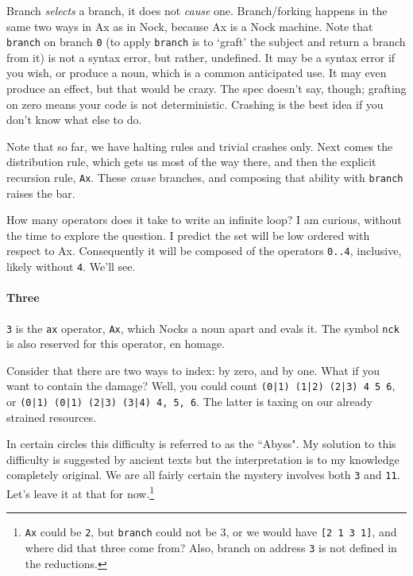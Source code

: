 \documentclass[twoside]{article}
\begin{document}
Branch \emph{selects} a branch, it does not \emph{cause} one. Branch/forking happens in the same two ways in Ax as in Nock, because Ax is a Nock machine. Note that \texttt{branch} on branch \texttt{0} (to apply \texttt{branch} is to `graft' the subject and return a branch from it) is not a syntax error, but rather, undefined. It may be a syntax error if you wish, or produce a noun, which is a common anticipated use. It may even produce an effect, but that would be crazy. The spec doesn't say, though; grafting on zero means your code is not deterministic. Crashing is the best idea if you don't know what else to do. 

Note that so far, we have halting rules and trivial crashes only. Next comes the distribution rule, which gets us most of the way there, and then the explicit recursion rule, \texttt{Ax}. These \emph{cause} branches, and composing that ability with \texttt{branch} raises the bar. 

How many operators does it take to write an infinite loop? I am curious, without the time to explore the question. I predict the set will be low ordered with respect to Ax. Consequently it will be composed of the operators \texttt{0..4}, inclusive, likely without \texttt{4}. We'll see. 

\paragraph{Three}

\texttt{3} is the \texttt{ax} operator, \texttt{Ax}, which Nocks a noun apart and evals it. The symbol \texttt{nck} is also reserved for this operator, en homage. %

Consider that there are two ways to index: by zero, and by one. What if you want to contain the damage? Well, you could count \texttt{(0|1) (1|2) (2|3) 4 5 6}, or \texttt{(0|1) (0|1) (2|3) (3|4) 4, 5, 6}. The latter is taxing on our already strained resources. 

In certain circles this difficulty is referred to as the ``Abyss". My solution to this difficulty is suggested by ancient texts but the interpretation is to my knowledge completely original. We are all fairly certain the mystery involves both \texttt{3} and \texttt{11}. Let's leave it at that for now.\footnote{\texttt{Ax} could be \texttt{2}, but \texttt{branch} could not be 3, or we would have \texttt{[2 1 3 1]}, and where did that three come from? Also, branch on address \texttt{3} is not defined in the reductions.}
\end{document}
